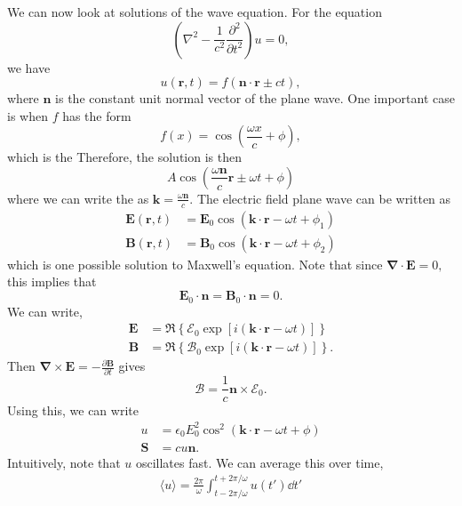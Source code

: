 \documentclass{article}
\numberwithin{equation}{section}
\begin{document}
We can now look at solutions of the wave equation. For the equation 
\begin{equation}
    \left(\nabla^2 - \frac{1}{c^2}\frac{\partial^2}{\partial t^2}\right) u = 0,
\end{equation}
we have 
\begin{equation}
    u(\bm{r},t) = f(\bm{n}\cdot \bm{r} \pm ct),
\end{equation}
where $\bm{n}$ is the constant unit normal vector of the plane wave. One important case is when $f$ has the form 
\begin{equation}
    f(x) = \cos(\frac{\omega x}{c} + \phi),
\end{equation}
which is the  Therefore, the solution is then 
\begin{equation}
    A\cos\left(\frac{\omega \bm{n}}{c}\bm{r} \pm \omega t + \phi\right)
\end{equation}
where we can write the  as $\bm{k} = \frac{\omega \bm{n}}{c}.$ The electric field plane wave can be written as 
\begin{align}
    \bm{E}(\bm{r},t) &= \bm{E}_0 \cos\left(\bm{k}\cdot \bm{r} - \omega t + \phi_1\right) \\ 
    \bm{B}(\bm{r},t) &= \bm{B}_0 \cos\left(\bm{k}\cdot \bm{r} - \omega t + \phi_2\right)
\end{align} 
which is one possible solution to Maxwell's equation. Note that since $\bm{\nabla}\cdot \bm{E} = 0,$ this implies that 
\begin{equation}
    \bm{E}_0 \cdot \bm{n} = \bm{B}_0 \cdot \bm{n} = 0.
\end{equation}
We can write,
\begin{align}
    \bm{E} &= \Re\left\{\mathcal{E}_0 \exp\left[i(\bm{k}\cdot \bm{r} - \omega t)\right]\right\} \\ 
    \bm{B} &= \Re\left\{\mathcal{B}_0 \exp\left[i(\bm{k}\cdot \bm{r} - \omega t)\right]\right\}.
\end{align}
Then $\bm{\nabla}\times \bm{E} = -\frac{\partial\bm{B}}{\partial t}$ gives 
\begin{equation}
    \boxed{\bm{\mathcal{B}} = \frac{1}{c}\bm{n} \times \bm{\mathcal{E}}_0}.
\end{equation}
Using this, we can write 
\begin{align}
    u &= \epsilon_0 E_0^2 \cos^2\left(\bm{k}\cdot \bm{r} - \omega t + \phi\right) \\ 
    \bm{S} &= cu\bm{n}.
\end{align}
Intuitively, note that $u$ oscillates fast. We can average this over time,
\begin{align}
    \langle u \rangle = \frac{2\pi}{\omega} \int_{t-2\pi/\omega}^{t+2\pi/\omega} u(t')\dd{t'}
\end{align}
\end{document}
